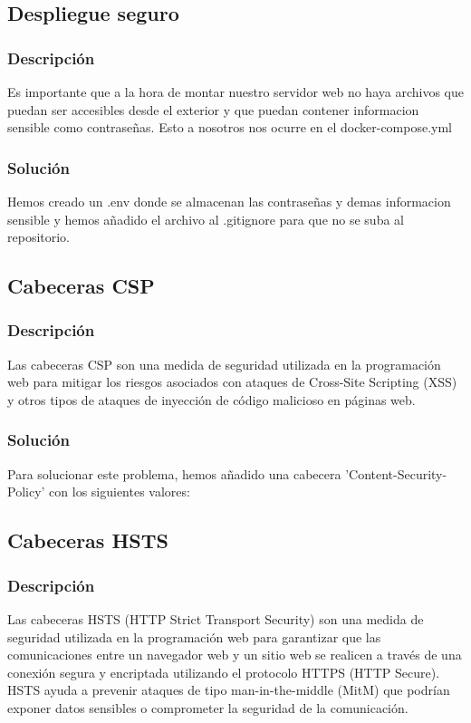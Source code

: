 \documentclass{report}
\begin{document}
            \subsection{Despliegue seguro}
                \subsubsection{Descripción}
                    Es importante que a la hora de montar nuestro servidor web no haya archivos que puedan ser accesibles desde el exterior y que puedan contener informacion sensible como contraseñas. Esto a nosotros nos ocurre en el docker-compose.yml
                \subsubsection{Solución}
                    Hemos creado un .env donde se almacenan las contraseñas y demas informacion sensible y hemos añadido el archivo al .gitignore para que no se suba al repositorio.
            \clearpage
            \subsection{Cabeceras CSP}
                \subsubsection{Descripción}
                    Las cabeceras CSP son una medida de seguridad utilizada en la programación web para mitigar los riesgos asociados con ataques de Cross-Site Scripting (XSS) y otros tipos de ataques de inyección de código malicioso en páginas web.
                \subsubsection{Solución}
                    Para solucionar este problema, hemos añadido una cabecera 'Content-Security-Policy' con los siguientes valores:
            \clearpage
            \subsection{Cabeceras HSTS}
                \subsubsection{Descripción}
                    Las cabeceras HSTS (HTTP Strict Transport Security) son una medida de seguridad utilizada en la programación web para garantizar que las comunicaciones entre un navegador web y un sitio web se realicen a través de una conexión segura y encriptada utilizando el protocolo HTTPS (HTTP Secure). HSTS ayuda a prevenir ataques de tipo man-in-the-middle (MitM) que podrían exponer datos sensibles o comprometer la seguridad de la comunicación.
\end{document}
